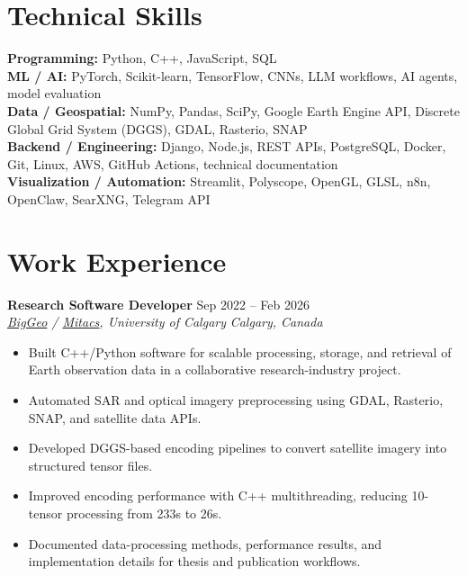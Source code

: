 \documentclass[a4paper,10pt]{article}
\newcommand{\resumeSubheading}[4]{
    \textbf{#1} \hfill #2 \\
    \textit{#3} \hfill \textit{#4}
}
\begin{document}
\section*{Technical Skills}

\textbf{Programming:} Python, C++, JavaScript, SQL \\
\textbf{ML / AI:} PyTorch, Scikit-learn, TensorFlow, CNNs, LLM workflows, AI agents, model evaluation \\
\textbf{Data / Geospatial:} NumPy, Pandas, SciPy, Google Earth Engine API, Discrete Global Grid System (DGGS), GDAL, Rasterio, SNAP \\
\textbf{Backend / Engineering:} Django, Node.js, REST APIs, PostgreSQL, Docker, Git, Linux, AWS, GitHub Actions, technical documentation \\
\textbf{Visualization / Automation:} Streamlit, Polyscope, OpenGL, GLSL, n8n, OpenClaw, SearXNG, Telegram API


\section*{Work Experience}

\resumeSubheading
{Research Software Developer}
{Sep 2022 -- Feb 2026}
{\href{https://biggeo.com}{BigGeo} / \href{https://www.mitacs.ca/}{Mitacs}, University of Calgary}
{Calgary, Canada}
\begin{itemize}[leftmargin=0.25in]
    \item Built C++/Python software for scalable processing, storage, and retrieval of Earth observation data in a collaborative research-industry project.
    \item Automated SAR and optical imagery preprocessing using GDAL, Rasterio, SNAP, and satellite data APIs.
    \item Developed DGGS-based encoding pipelines to convert satellite imagery into structured tensor files.
    \item Improved encoding performance with C++ multithreading, reducing 10-tensor processing from 233s to 26s.
    \item Documented data-processing methods, performance results, and implementation details for thesis and publication workflows.
\end{itemize}
\end{document}
